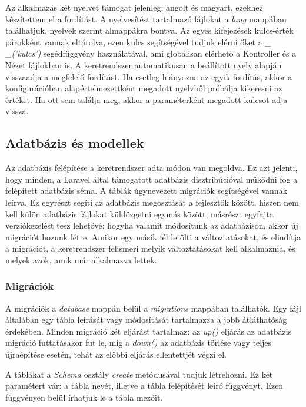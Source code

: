 \documentclass[
]{thesis-ekf}
\theoremstyle{definition}
\theoremstyle{remark}
\begin{document}
Az alkalmazás két nyelvet támogat jelenleg: angolt és magyart, ezekhez készítettem el a fordítást. A nyelvesítést tartalmazó fájlokat a \emph{lang} mappában találhatjuk, nyelvek szerint almappákra bontva. Az egyes kifejezések kulcs-érték párokként vannak eltárolva, ezen kulcs segítségével tudjuk elérni őket a \emph{\_\,\_('kulcs')} segédfüggvény használatával, ami globálisan elérhető a Kontroller és a Nézet fájlokban is. A keretrendszer automatikusan a beállított nyelv alapján visszaadja a megfelelő fordítást. Ha esetleg hiányozna az egyik fordítás, akkor a konfigurációban alapértelmezettként megadott nyelvből próbálja kikeresni az értéket. Ha ott sem találja meg, akkor a paraméterként megadott kulcsot adja vissza.

\subsection{Adatbázis és modellek}

Az adatbázis felépítése a keretrendszer adta módon van megoldva. Ez azt jelenti, hogy minden, a Laravel által támogatott adatbázis disztribúcióval működni fog a felépített adatbázis séma. A táblák úgynevezett migrációk segítségével vannak leírva. Ez egyrészt segíti az adatbázis megosztását a fejlesztők között, hiszen nem kell külön adatbázis fájlokat küldözgetni egymás között, másrészt egyfajta verziókezelést tesz lehetővé: hogyha valamit módosítunk az adatbázison, akkor új migrációt hozunk létre. Amikor egy másik fél letölti a változtatásokat, és elindítja a migrációt, a keretrendszer felismeri melyik változtatásokat kell alkalmaznia, és melyek azok, amik már alkalmazva lettek.\cite{migrations}

\subsubsection{Migrációk}

A migrációk a \emph{database} mappán belül a \emph{migrations} mappában találhatók. Egy fájl általában egy tábla leírását vagy módosítását tartalmazza a jobb átláthatóság érdekében. Minden migráció két eljárást tartalmaz: az \emph{up()} eljárás az adatbázis migráció futtatásakor fut le, míg a \emph{down()} az adatbázis törlése vagy teljes újraépítése esetén, tehát az előbbi eljárás ellentettjét végzi el.\cite{migrations}

A táblákat a \emph{Schema} osztály \emph{create} metódusával tudjuk létrehozni. Ez két paramétert vár: a tábla nevét, illetve a tábla felépítését leíró függvényt. Ezen függvényen belül írhatjuk le a tábla mezőit.
\end{document}
